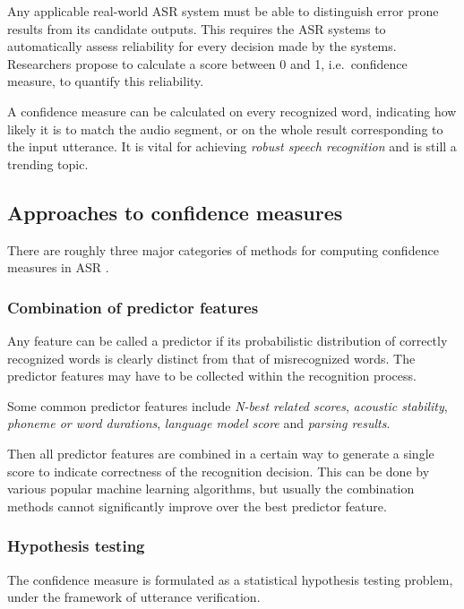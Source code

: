 \documentclass[11pt,a4paper]{report}
\begin{document}
Any applicable real-world ASR system must be able to distinguish error prone results from its candidate outputs.
This requires the ASR systems to automatically assess reliability for every decision made by the systems.
Researchers propose to calculate a score between 0 and 1, i.e.\, confidence measure, to quantify this reliability.

A confidence measure can be calculated on every recognized word, indicating how likely it is to match the audio segment, or on the whole result corresponding to the input utterance.
It is vital for achieving \emph{robust speech recognition} and is still a trending topic.

\subsection{Approaches to confidence measures}

There are roughly three major categories of methods for computing confidence measures in ASR \parencite{jiang2005confidence}.

\subsubsection{Combination of predictor features}

Any feature can be called a predictor if its probabilistic distribution of correctly recognized words is clearly distinct from that of misrecognized words.
The predictor features may have to be collected within the recognition process.

Some common predictor features include \textit{N-best related scores}, \textit{acoustic stability}, \textit{phoneme or word durations}, \textit{language model score} and \textit{parsing results}.

Then all predictor features are combined in a certain way to generate a single score to indicate correctness of the recognition decision.
This can be done by various popular machine learning algorithms, but usually the combination methods cannot significantly improve over the best predictor feature.

\subsubsection{Hypothesis testing}

The confidence measure is formulated as a statistical hypothesis testing problem, under the framework of utterance verification.
\end{document}
